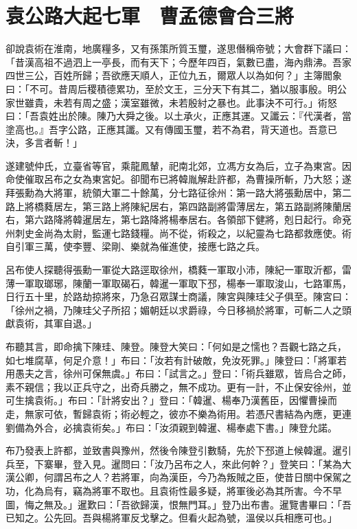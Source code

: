 
\chapter{袁公路大起七軍　曹孟德會合三將}

卻說袁術在淮南，地廣糧多，又有孫策所質玉璽，遂思僭稱帝號；大會群下議曰：「昔漢高祖不過泗上一亭長，而有天下；今歷年四百，氣數已盡，海內鼎沸。吾家四世三公，百姓所歸；吾欲應天順人，正位九五，爾眾人以為如何？」主簿閻象曰：「不可。昔周后稷積德累功，至於文王，三分天下有其二，猶以服事殷。明公家世雖貴，未若有周之盛；漢室雖微，未若殷紂之暴也。此事決不可行。」術怒曰：「吾袁姓出於陳。陳乃大舜之後。以土承火，正應其運。又讖云：『代漢者，當塗高也。』吾字公路，正應其讖。又有傳國玉璽，若不為君，背天道也。吾意已決，多言者斬！」

遂建號仲氏，立臺省等官，乘龍鳳輦，祀南北郊，立馮方女為后，立子為東宮。因命使催取呂布之女為東宮妃。卻聞布已將韓胤解赴許都，為曹操所斬，乃大怒；遂拜張勳為大將軍，統領大軍二十餘萬，分七路征徐州：第一路大將張勳居中，第二路上將橋蕤居左，第三路上將陳紀居右，第四路副將雷薄居左，第五路副將陳蘭居右，第六路降將韓暹居左，第七路降將楊奉居右。各領部下健將，剋日起行。命兗州刺史金尚為太尉，監運七路錢糧。尚不從，術殺之，以紀靈為七路都救應使。術自引軍三萬，使李豐、梁剛、樂就為催進使，接應七路之兵。

呂布使人探聽得張勳一軍從大路逕取徐州，橋蕤一軍取小沛，陳紀一軍取沂都，雷薄一軍取瑯琊，陳蘭一軍取碣石，韓暹一軍取下邳，楊奉一軍取浚山，七路軍馬，日行五十里，於路劫掠將來，乃急召眾謀士商議，陳宮與陳珪父子俱至。陳宮曰：「徐州之禍，乃陳珪父子所招；媚朝廷以求爵祿，今日移禍於將軍，可斬二人之頭獻袁術，其軍自退。」

布聽其言，即命擒下陳珪、陳登。陳登大笑曰：「何如是之懦也？吾觀七路之兵，如七堆腐草，何足介意！」布曰：「汝若有計破敵，免汝死罪。」陳登曰：「將軍若用愚夫之言，徐州可保無虞。」布曰：「試言之。」登曰：「術兵雖眾，皆烏合之師，素不親信；我以正兵守之，出奇兵勝之，無不成功。更有一計，不止保安徐州，並可生擒袁術。」布曰：「計將安出？」登曰：「韓暹、楊奉乃漢舊臣，因懼曹操而走，無家可依，暫歸袁術；術必輕之，彼亦不樂為術用。若憑尺書結為內應，更連劉備為外合，必擒袁術矣。」布曰：「汝須親到韓暹、楊奉處下書。」陳登允諾。

布乃發表上許都，並致書與豫州，然後令陳登引數騎，先於下邳道上候韓暹。暹引兵至，下寨畢，登入見。暹問曰：「汝乃呂布之人，來此何幹？」登笑曰：「某為大漢公卿，何謂呂布之人？若將軍，向為漢臣，今乃為叛賊之臣，使昔日關中保駕之功，化為烏有，竊為將軍不取也。且袁術性最多疑，將軍後必為其所害。今不早圖，悔之無及。」暹歎曰：「吾欲歸漢，恨無門耳。」登乃出布書。暹覽書畢曰：「吾已知之。公先回。吾與楊將軍反戈擊之。但看火起為號，溫侯以兵相應可也。」

